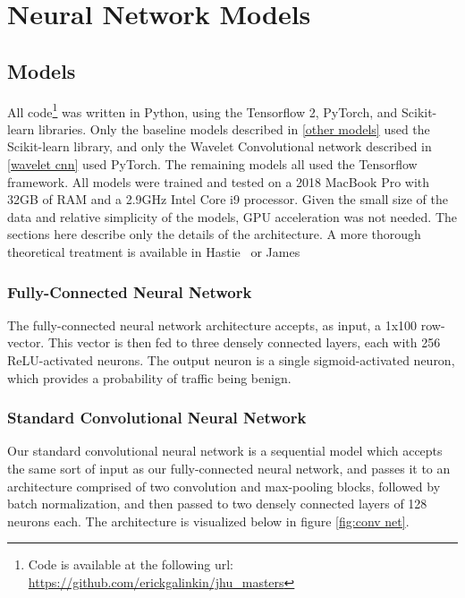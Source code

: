 \footnotesize
\renewcommand{\thechapter}{\Roman{chapter}}

\renewcommand{\thesection}{\Alph{section}.}

\chapter{Neural Network Models}
\label{append:two}

\section{Models}
All code\footnote{Code is available at the following url: \url{https://github.com/erickgalinkin/jhu_masters}} was written in Python, using the Tensorflow 2, PyTorch, and Scikit-learn libraries.
Only the baseline models described in \ref{other models} used the Scikit-learn library, and only the Wavelet Convolutional network described in \ref{wavelet cnn} used PyTorch.
The remaining models all used the Tensorflow framework.
All models were trained and tested on a 2018 MacBook Pro with 32GB of RAM and a 2.9GHz Intel Core i9 processor.
Given the small size of the data and relative simplicity of the models, GPU acceleration was not needed.
The sections here describe only the details of the architecture.
A more thorough theoretical treatment is available in Hastie~\cite{hastie01statisticallearning} or James~\cite{james14introduction}

\subsection{Fully-Connected Neural Network}
The fully-connected neural network architecture accepts, as input, a 1x100 row-vector.
This vector is then fed to three densely connected layers, each with 256 ReLU-activated neurons.
The output neuron is a single sigmoid-activated neuron, which provides a probability of traffic being benign.

\subsection{Standard Convolutional Neural Network}
Our standard convolutional neural network is a sequential model which accepts the same sort of input as our fully-connected neural network, and passes it to an architecture comprised of two convolution and max-pooling blocks, followed by batch normalization, and then passed to two densely connected layers of 128 neurons each. The architecture is visualized below in figure \ref{fig:conv net}.

